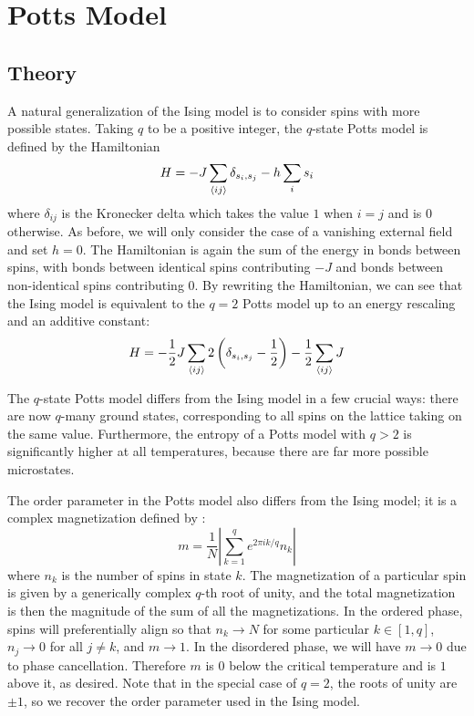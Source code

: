 \documentclass[twocolumn,aps]{revtex4-1} %
\begin{document}
\section{Potts Model}
\subsection{Theory}
A natural generalization of the Ising model is to consider spins with more possible states. Taking $q$ to be a positive integer, the $q$-state Potts model is defined by the Hamiltonian
\begin{equation}
	H = -J\sum_{\braket{ij}}\delta_{s_i,s_j} - h\sum_{i}s_i
\end{equation}
where $\delta_{ij}$ is the Kronecker delta which takes the value $1$ when $i = j$ and is 0 otherwise. As before, we will only consider the case of a vanishing external field and set $h = 0$. The Hamiltonian is again the sum of the energy in bonds between spins, with bonds between identical spins contributing $-J$ and bonds between non-identical spins contributing 0. By rewriting the Hamiltonian, we can see that the Ising model is equivalent to the $q = 2$ Potts model up to an energy rescaling and an additive constant:
\begin{equation}
	H = -\frac{1}{2}J\sum_{\braket{ij}}2\left(\delta_{s_i,s_j} - \frac{1}{2}\right) - \frac{1}{2}\sum_{\braket{ij}}J
\end{equation}

The $q$-state Potts model differs from the Ising model in a few crucial ways: there are now $q$-many ground states, corresponding to all spins on the lattice taking on the same value. Furthermore, the entropy of a Potts model with $q > 2$ is significantly higher at all temperatures, because there are far more possible microstates.

The order parameter in the Potts model also differs from the Ising model; it is a complex magnetization defined by \cite{potts}:
\begin{equation}
	m = \frac{1}{N}\left|\sum_{k=1}^qe^{2\pi i k/q}n_k\right|
\end{equation}
where $n_k$ is the number of spins in state $k$. The magnetization of a particular spin is given by a generically complex $q$-th root of unity, and the total magnetization is then the magnitude of the sum of all the magnetizations. In the ordered phase, spins will preferentially align so that $n_k \to N$ for some particular $k \in [1,q]$, $n_j \to 0$ for all $j \neq k$, and $m \to 1$. In the disordered phase, we will have $m \to 0$ due to phase cancellation. Therefore $m$ is 0 below the critical temperature and is $1$ above it, as desired. Note that in the special case of $q = 2$, the roots of unity are $\pm 1$, so we recover the order parameter used in the Ising model.
\end{document}
